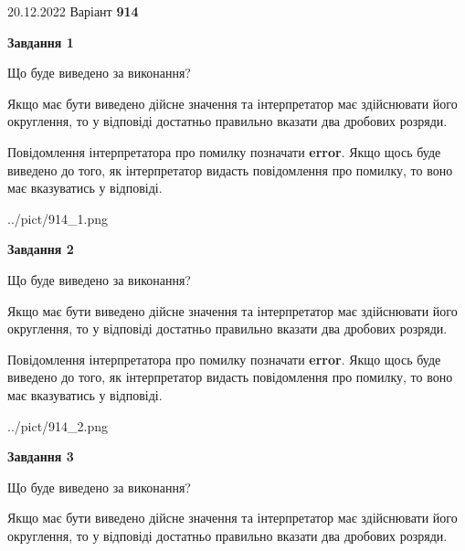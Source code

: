 \documentclass[12pt, ukrainian]{article}
\begin{document}
{20.12.2022 Варіант \No \textbf { 914 }\par}
{
\begin {Large}

{\begin {center}\textbf{Завдання 1}\end {center}}\par
Що буде виведено за виконання? \par

Якщо має бути виведено дійсне значення та інтерпретатор має здійснювати його округлення, 
то у відповіді достатньо правильно вказати два дробових розряди.

Повідомлення інтерпретатора про помилку позначати \textbf{error}.
Якщо щось буде виведено до того, як інтерпретатор видасть повідомлення про помилку, 
то воно має вказуватись у відповіді. \par

\begin{center}
	{../pict/914_1.png}
\end{center}
\newpage

{\begin {center}\textbf{Завдання 2}\end {center}}\par
Що буде виведено за виконання? \par

Якщо має бути виведено дійсне значення та інтерпретатор має здійснювати його округлення, 
то у відповіді достатньо правильно вказати два дробових розряди.

Повідомлення інтерпретатора про помилку позначати \textbf{error}.
Якщо щось буде виведено до того, як інтерпретатор видасть повідомлення про помилку, 
то воно має вказуватись у відповіді. \par

\begin{center}
	{../pict/914_2.png}
\end{center}
\newpage

{\begin {center}\textbf{Завдання 3}\end {center}}\par
Що буде виведено за виконання? \par

Якщо має бути виведено дійсне значення та інтерпретатор має здійснювати його округлення, 
то у відповіді достатньо правильно вказати два дробових розряди.


\end{Large}}
\end{document}
